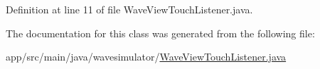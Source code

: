 Definition at line 11 of file Wave\+View\+Touch\+Listener.\+java.



The documentation for this class was generated from the following file\+:\begin{DoxyCompactItemize}
\item 
app/src/main/java/wavesimulator/\hyperlink{WaveViewTouchListener_8java}{Wave\+View\+Touch\+Listener.\+java}\end{DoxyCompactItemize}
